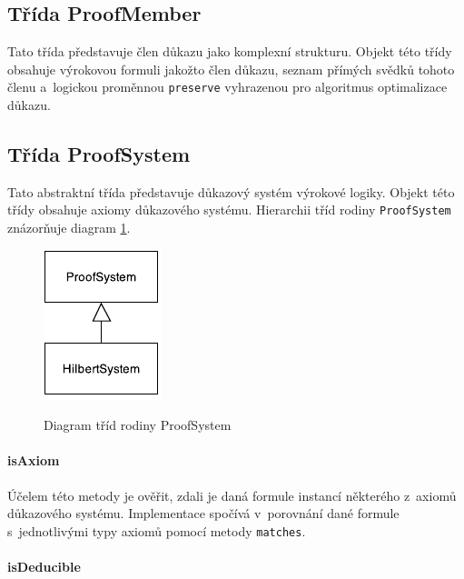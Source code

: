 \documentclass[thesis=B,czech,hidelinks]{thesis}[2012/06/26]
\begin{document}
\subsection{Třída ProofMember}

Tato třída představuje člen důkazu jako komplexní strukturu. Objekt této třídy obsahuje výrokovou formuli jakožto člen důkazu, seznam přímých svědků tohoto členu a~logickou proměnnou \texttt{preserve} vyhrazenou pro algoritmus optimalizace důkazu.

\subsection{Třída ProofSystem}

Tato abstraktní třída představuje důkazový systém výrokové logiky. Objekt této třídy obsahuje axiomy důkazového systému. Hierarchii tříd rodiny \texttt{ProofSystem} znázorňuje diagram \ref{fig:proof_system}.

\begin{figure}
\centering
\caption{Diagram tříd rodiny ProofSystem}
\includegraphics{diagrams/proof_system}
\label{fig:proof_system}
\end{figure}

\paragraph{isAxiom}

Účelem této metody je ověřit, zdali je daná formule instancí některého z~axiomů důkazového systému. Implementace spočívá v~porovnání dané formule s~jednotlivými typy axiomů pomocí metody \texttt{matches}.

\begin{algorithm}
{
	{
		\;
	}
}
\end{algorithm}

\paragraph{isDeducible}
\end{document}
